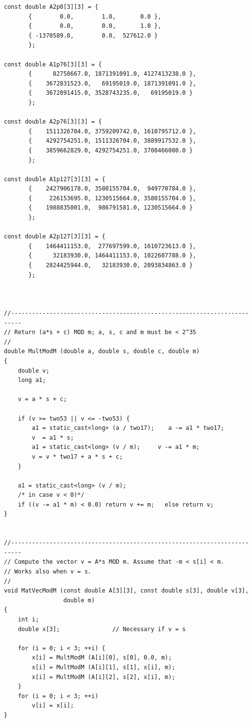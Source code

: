 \documentclass[12pt]{article}
\begin{document}
\begin{verbatim}
const double A2p0[3][3] = {
       {        0.0,        1.0,       0.0 },
       {        0.0,        0.0,       1.0 },
       { -1370589.0,        0.0,  527612.0 }
       };

const double A1p76[3][3] = {
       {      82758667.0, 1871391091.0, 4127413238.0 },
       {    3672831523.0,   69195019.0, 1871391091.0 },
       {    3672091415.0, 3528743235.0,   69195019.0 }
       };

const double A2p76[3][3] = {
       {    1511326704.0, 3759209742.0, 1610795712.0 },
       {    4292754251.0, 1511326704.0, 3889917532.0 },
       {    3859662829.0, 4292754251.0, 3708466080.0 }
       };

const double A1p127[3][3] = {
       {    2427906178.0, 3580155704.0,  949770784.0 },
       {     226153695.0, 1230515664.0, 3580155704.0 },
       {    1988835001.0,  986791581.0, 1230515664.0 }
       };

const double A2p127[3][3] = {
       {    1464411153.0,  277697599.0, 1610723613.0 },
       {      32183930.0, 1464411153.0, 1022607788.0 },
       {    2824425944.0,   32183930.0, 2093834863.0 }
       };



//-------------------------------------------------------------------------
// Return (a*s + c) MOD m; a, s, c and m must be < 2^35
//
double MultModM (double a, double s, double c, double m)
{
    double v;
    long a1;

    v = a * s + c;

    if (v >= two53 || v <= -two53) {
        a1 = static_cast<long> (a / two17);    a -= a1 * two17;
        v  = a1 * s;
        a1 = static_cast<long> (v / m);     v -= a1 * m;
        v = v * two17 + a * s + c;
    }

    a1 = static_cast<long> (v / m);
    /* in case v < 0)*/
    if ((v -= a1 * m) < 0.0) return v += m;   else return v;
}


//-------------------------------------------------------------------------
// Compute the vector v = A*s MOD m. Assume that -m < s[i] < m.
// Works also when v = s.
//
void MatVecModM (const double A[3][3], const double s[3], double v[3],
                 double m)
{
    int i;
    double x[3];               // Necessary if v = s

    for (i = 0; i < 3; ++i) {
        x[i] = MultModM (A[i][0], s[0], 0.0, m);
        x[i] = MultModM (A[i][1], s[1], x[i], m);
        x[i] = MultModM (A[i][2], s[2], x[i], m);
    }
    for (i = 0; i < 3; ++i)
        v[i] = x[i];
}



\end{verbatim}
\end{document}
